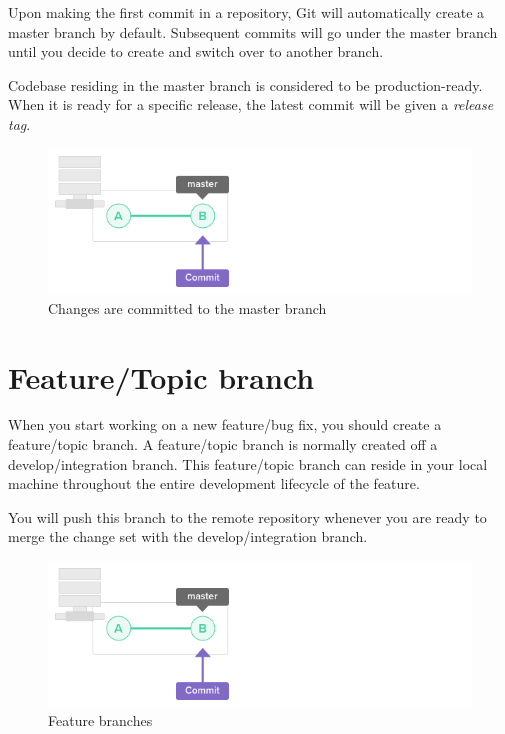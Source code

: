 \documentclass[10pt,a4paper,english]{report}
\begin{document}
    Upon making the first commit in a repository, Git will automatically create a master branch by default. Subsequent commits will go under the master branch until you decide to create and switch over to another branch.

    Codebase residing in the master branch is considered to be production-ready. When it is ready for a specific release, the latest commit will be given a \emph{release tag}.

    \begin{figure}[ht]
    \begin{center}
    \includegraphics[scale=0.5]{images/branching_workflows_002.png}
    \end{center}
    \caption{Changes are committed to the master branch}
    \end{figure}

    \section{Feature/Topic branch}
    \label{sec:branching:feature-branch}

    When you start working on a new feature/bug fix, you should create a feature/topic branch. A feature/topic branch is normally created off a develop/integration branch. This feature/topic branch can reside in your local machine throughout the entire development lifecycle of the feature.

    You will push this branch to the remote repository whenever you are ready to merge the change set with the develop/integration branch.

    \begin{figure}[ht]
    \begin{center}
    \includegraphics[scale=0.5]{images/branching_workflows_002.png}
    \end{center}
    \caption{Feature branches}
    \end{figure}
\end{document}
